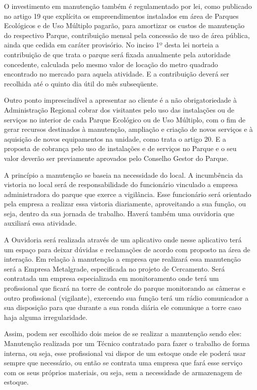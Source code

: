 	O investimento em manutenção também é regulamentado por lei, como publicado no artigo 19 que explícita os empreendimentos instalados em área de Parques Ecológicos e de Uso Múltiplo pagarão, para amortizar os custos de manutenção do respectivo Parque, contribuição mensal pela concessão de uso de área pública, ainda que cedida em caráter provisório. No inciso 1º desta lei norteia a contribuição de que trata o parque será fixada anualmente pela autoridade concedente, calculada pelo mesmo valor de locação do metro quadrado encontrado no mercado para aquela atividade. E a contribuição deverá ser recolhida até o quinto dia útil do mês subseqüente.
        
	Outro ponto imprescindível a apresentar ao cliente é a não obrigatoriedade à Administração Regional cobrar dos visitantes pelo uso das instalações ou de serviços no interior de cada Parque Ecológico ou de Uso Múltiplo, com o fim de gerar recursos destinados à manutenção, ampliação e criação de novos serviços e à aquisição de novos equipamentos na unidade, como trata o artigo 20. E a proposta de cobrança pelo uso de instalações e de serviços no Parque e o seu valor deverão ser previamente aprovados pelo Conselho Gestor do Parque.  
        	
	A princípio a manutenção se baseia na necessidade do local. A incumbência da vistoria no local será de responsabilidade do funcionário vinculado a empresa administradora do parque que exerce a vigilância. Esse funcionário será orientado pela empresa a realizar essa vistoria diariamente, aproveitando a sua função, ou seja, dentro da sua jornada de trabalho. Haverá também uma ouvidoria que auxiliará essa atividade.
	
	A Ouvidoria será realizada através de um aplicativo onde nesse aplicativo terá um espaço para deixar dúvidas e reclamações de acordo com proposto na área de interação. Em relação à manutenção a empresa que realizará essa manutenção será a Empresa Metalgrade, especificada no projeto de Cercamento. Será contratada um empresa especializada em monitoramento onde terá um profissional que ficará na torre de controle do parque monitorando as câmeras e outro profissional (vigilante), exercendo sua função terá um rádio comunicador a sua disposição para que durante a sua ronda diária ele comunique a torre caso haja alguma irregularidade.
	
	Assim, podem ser escolhido dois meios de se realizar a manutenção sendo eles: Manutenção realizada por um Técnico contratado para fazer o trabalho de forma interna, ou seja, esse profissional vai dispor de um estoque onde ele poderá usar sempre que necessário, ou então se contrata uma empresa que fará esse serviço com os seus próprios materiais, ou seja, sem a necessidade de armazenagem de estoque.
	
